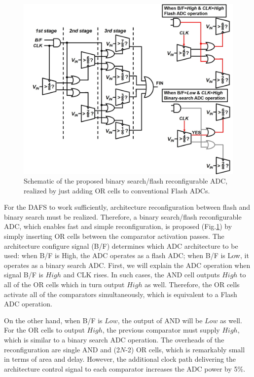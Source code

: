 \begin{figure}
\centering
  \includegraphics[width=1\textwidth]{figure/chap3/fig3.jpg}
  \caption{Schematic of the proposed binary search/flash reconfigurable ADC, realized by just adding OR cells to conventional Flash ADCs.}
  \label{fig-3-3}
\end{figure}

For the DAFS to work sufficiently, architecture reconfiguration between flash and binary search must be realized. 
Therefore, a binary search/flash reconfigurable ADC, which enables fast and simple reconfiguration, is proposed (Fig.\ref{fig-3-3}) by simply inserting OR cells between the comparator activation passes. 
The architecture configure signal (B/F) determines which ADC architecture to be used: when B/F is High, the ADC operates as a flash ADC; when B/F is Low, it operates as a binary search ADC.  
First, we will explain the ADC operation when signal B/F is $High$ and CLK rises. In such cases, the AND cell outputs $High$ to all of the OR cells which in turn output $High$ as well. Therefore, the OR cells activate all of the comparators simultaneously, which is equivalent to a Flash ADC operation. 

On the other hand, when B/F is $Low$, the output of AND will be $Low$ as well. For the OR cells to output $High$, the previous comparator must supply $High$, which is similar to a binary search ADC operation. The overheads of the reconfiguration are single AND and (2$N$-2) OR cells, which is remarkably small in terms of area and delay. However, the additional clock path delivering the architecture control signal to each comparator increases the ADC power by 5\%. 

